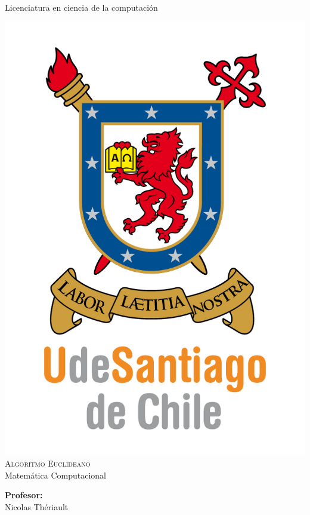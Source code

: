 \documentclass[12pt,letterpaper]{scrartcl}
\author{Don cuyi}
\begin{document}
\begin{titlepage}

\begin{center}

{\Large { Licenciatura en ciencia de la computación} }

\includegraphics[scale=1]{UDSCNRJ}
\\[1cm]

{\Huge \textsc{Algoritmo Euclideano}}\\[0.7cm]

{\huge  Matemática Computacional}\\[2cm]


\begin{minipage}[l]{0.4\textwidth}
	\begin{flushleft}
	\linespread{1}
		\textbf{\textsf{Profesor:}}\\
		\large Nicolas Thériault
	\end{flushleft}
\end{minipage}
\begin{minipage}[l]{0.4\textwidth}


\end{minipage}
\end{center}
\end{titlepage}
\end{document}
